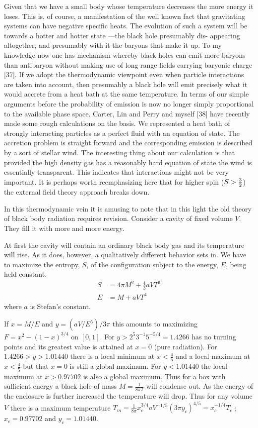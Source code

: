 Given that we have a small body whose temperature decreases the more
energy it loses. This is, of course, a manifestation of the well known fact that
gravitating systems can have negative specific heats. The evolution of such
a system will be towards a hotter and hotter state ---the black hole presumably dis-
appearing altogether, and presumably with it the baryons that make it up. To my
knowledge now one has mechanism whereby black holes can emit more baryons than
antibaryon without making use of long range fields carrying baryonic charge [37].
If we adopt the thermodynamic viewpoint even when particle interactions
are taken into account, then presumably a black hole will emit precisely what it
would accrete from a heat bath at the same temperature. In terms of our simple
arguments before the probability of emission is now no longer simply proportional
to the available phase space. Carter, Lin and Perry and myself [38] have recently
made some rough calculations on the basis. We represented a heat bath of strongly
interacting particles as a perfect fluid with an equation of state. The accretion
problem is straight forward and the corresponding emission is described by
a sort of stellar wind. The interesting thing about our calculation is that
provided the high density gas has a reasonably hard equation of state the wind is
essentially transparent. This indicates that interactions might not be very
important. It is perhaps worth reemphasizing here that for higher spin
($S > {\small \frac{3}{2}}$) the external field theory approach breaks down.

In this thermodynamic vein it is amusing to note that in this light the
old theory of black body radiation requires revision. Consider a cavity of fixed
volume $V$. They fill it with more and more energy.

At first the cavity will contain an ordinary black body gas and its
temperature will rise. As it does, however, a qualitatively different behavior sets
in. We have to maximize the entropy, $S$, of the configuration subject to the
energy, $E$, being held constant.
\begin{align}
S &= 4\pi M^2 + \frac{4}{3}a VT^3\\
E &= M + aVT^4
\end{align}
where $a$ is Stefan's constant.

If $x = M/E$ and $y = (aV/E^5)/3\pi$ this amounts to maximizing $F = x^2 - (1-x)^{3/4}$
on $[0,1]$. For $y > {2^5}{3^{-1}} 5^{-5/4} = 1.4266$ has no turning points and its greatest
value is attained at $x=0$ (pure radiation). For $1.4266 > y > 1.01440$ there is a
local minimum at $x < \frac{4}{5}$ and a local maximum at $x < \frac{4}{5}$ but 
that $x = 0$ is still a global maximum. For $y< 1.01440$ the local maximum at $x > 0.97702$
is also a global maximum.
Thus for a box with sufficient energy a black hole of
mass $M = \frac{1}{8\pi T}$ will condense out.
As the energy of the enclosure is further increased the temperature will drop.
Thus for any volume $V$ there is a maximum temperature 
$T_m = \frac{1}{8\pi}x_c^{3/4}aV^{-1/5}(3\pi y_c)^{4/5} = x_c^{-1/4} T_c$ ; 
$x_c = 0.97702$ and $y_c = 1.01440$.

